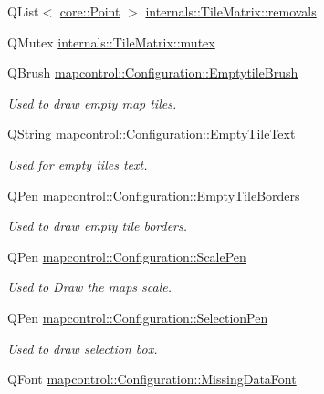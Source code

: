 \begin{DoxyCompactItemize}
\item 
\-Q\-List$<$ \hyperlink{structcore_1_1_point}{core\-::\-Point} $>$ \hyperlink{group___o_p_map_widget_gaba9b5e3cf2e51b2a87c5a343968573e9}{internals\-::\-Tile\-Matrix\-::removals}
\item 
\-Q\-Mutex \hyperlink{group___o_p_map_widget_gae5c51dfc2c2d290c958e335bef18f0a1}{internals\-::\-Tile\-Matrix\-::mutex}
\item 
\-Q\-Brush \hyperlink{group___o_p_map_widget_gad6bf957803f87dacf49bbff6998c72b6}{mapcontrol\-::\-Configuration\-::\-Emptytile\-Brush}
\begin{DoxyCompactList}\small\item\em \-Used to draw empty map tiles. \end{DoxyCompactList}\item 
\hyperlink{group___u_a_v_objects_plugin_gab9d252f49c333c94a72f97ce3105a32d}{\-Q\-String} \hyperlink{group___o_p_map_widget_ga3cee2f55adac9ad6424d5ea36a1fec54}{mapcontrol\-::\-Configuration\-::\-Empty\-Tile\-Text}
\begin{DoxyCompactList}\small\item\em \-Used for empty tiles text. \end{DoxyCompactList}\item 
\-Q\-Pen \hyperlink{group___o_p_map_widget_gae8db48d6cb03fedba7aa82d206dc82eb}{mapcontrol\-::\-Configuration\-::\-Empty\-Tile\-Borders}
\begin{DoxyCompactList}\small\item\em \-Used to draw empty tile borders. \end{DoxyCompactList}\item 
\-Q\-Pen \hyperlink{group___o_p_map_widget_gab4e66a6217ae69c3344a0af8578f5932}{mapcontrol\-::\-Configuration\-::\-Scale\-Pen}
\begin{DoxyCompactList}\small\item\em \-Used to \-Draw the maps scale. \end{DoxyCompactList}\item 
\-Q\-Pen \hyperlink{group___o_p_map_widget_gab3ccb3d980f16de07166bad27b8ff4dc}{mapcontrol\-::\-Configuration\-::\-Selection\-Pen}
\begin{DoxyCompactList}\small\item\em \-Used to draw selection box. \end{DoxyCompactList}\item 
\-Q\-Font \hyperlink{group___o_p_map_widget_gacaef660cdedd3dc5c76abc6f6872b149}{mapcontrol\-::\-Configuration\-::\-Missing\-Data\-Font}

\end{DoxyCompactItemize}
